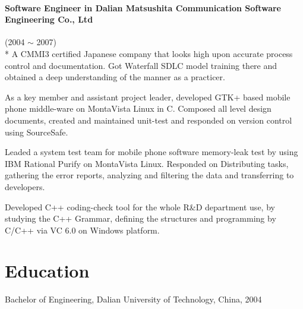 \documentclass[a4paper,11pt]{article}
\begin{document}
\paragraph{Software Engineer in Dalian Matsushita Communication Software Engineering Co., Ltd} (2004 $\sim$ 2007) \\*
A CMMI3 certified Japanese company that looks high upon accurate process control and documentation. Got Waterfall SDLC model training there and obtained a deep understanding of the manner as a practicer. 
\begin{itemize*}
    \setlength\itemsep{0.4em}
  \item As a key member and assistant project leader, developed GTK+ based mobile phone middle-ware on MontaVista Linux in C. Composed all level design documents, created and maintained unit-test and responded on version control using SourceSafe.
  \item Leaded a system test team for mobile phone software memory-leak test by using IBM Rational Purify on MontaVista Linux. Responded on Distributing tasks, gathering the error reports, analyzing and filtering the data and transferring to developers.
  \item Developed C++ coding-check tool for the whole R\&D department use, by studying the C++ Grammar, defining the structures and programming by C/C++ via VC 6.0 on Windows platform.
\end{itemize*}

\section*{Education}
Bachelor of Engineering, Dalian University of Technology, China, 2004
\end{document}
